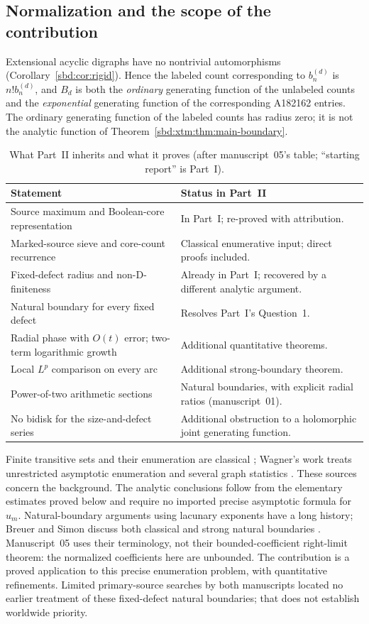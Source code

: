 \documentclass[11pt,a4paper]{article}
\theoremstyle{definition}
\begin{document}
\subsection{Normalization and the scope of the contribution}
Extensional acyclic digraphs have no nontrivial automorphisms
(Corollary~\ref{sbd:cor:rigid}). Hence the labeled count corresponding to
$b_n^{(d)}$ is $n!b_n^{(d)}$, and $B_d$ is both the \emph{ordinary}
generating function of the unlabeled counts and the \emph{exponential}
generating function of the corresponding A182162 entries. The ordinary
generating function of the labeled counts has radius zero; it is not the
analytic function of Theorem~\ref{sbd:xtm:thm:main-boundary}.

\begin{table}[htbp]
\centering\small
\caption{What Part~II inherits and what it proves (after manuscript~05's
table; ``starting report'' is Part~I).}
\label{sbd:xtm:tab:scope}
\begin{tabular}{p{}p{}}
\toprule
Statement & Status in Part~II\\
\midrule
Source maximum and Boolean-core representation & In Part~I; re-proved
with attribution.\\
Marked-source sieve and core-count recurrence & Classical enumerative
input; direct proofs included.\\
Fixed-defect radius and non-D-finiteness & Already in Part~I;
recovered by a different analytic argument.\\
Natural boundary for every fixed defect & Resolves Part~I's
Question~1.\\
Radial phase with $O(t)$ error; two-term logarithmic growth & Additional
quantitative theorems.\\
Local $L^p$ comparison on every arc & Additional strong-boundary
theorem.\\
Power-of-two arithmetic sections & Natural boundaries, with explicit
radial ratios (manuscript~01).\\
No bidisk for the size-and-defect series & Additional obstruction
to a holomorphic joint generating function.\\
\bottomrule
\end{tabular}
\end{table}

Finite transitive sets and their enumeration are classical
\cite{peddicord,policriti,tomescu}; Wagner's work treats unrestricted
asymptotic enumeration and several graph statistics
\cite{wagner,wagner13}. These sources concern the background. The analytic
conclusions follow from the elementary estimates proved below and require
no imported precise asymptotic formula for $u_m$. Natural-boundary arguments
using lacunary exponents have a long history; Breuer and Simon discuss both
classical and strong natural boundaries \cite{breuersimon}. Manuscript~05
uses their terminology, not their bounded-coefficient right-limit theorem:
the normalized coefficients here are unbounded. The contribution is a proved
application to this precise enumeration problem, with quantitative
refinements. Limited primary-source searches by both manuscripts located no
earlier treatment of these fixed-defect natural boundaries; that does not
establish worldwide priority.
\end{document}
